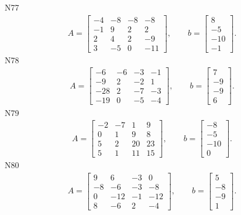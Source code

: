 \documentclass[11pt]{report}
\begin{document}
N77
\begin{align*}
 A = \left[\begin{matrix}-4 & -8 & -8 & -8\\-1 & 9 & 2 & 2\\2 & 4 & 2 & -9\\3 & -5 & 0 & -11\end{matrix}\right],
\qquad b = \left[\begin{matrix}8\\-5\\-10\\-1\end{matrix}\right]. 
 \end{align*}
N78
\begin{align*}
 A = \left[\begin{matrix}-6 & -6 & -3 & -1\\-9 & 2 & -2 & 1\\-28 & 2 & -7 & -3\\-19 & 0 & -5 & -4\end{matrix}\right],
\qquad b = \left[\begin{matrix}7\\-9\\-9\\6\end{matrix}\right]. 
 \end{align*}
N79
\begin{align*}
 A = \left[\begin{matrix}-2 & -7 & 1 & 9\\0 & 1 & 9 & 8\\5 & 2 & 20 & 23\\5 & 1 & 11 & 15\end{matrix}\right],
\qquad b = \left[\begin{matrix}-8\\-5\\-10\\0\end{matrix}\right]. 
 \end{align*}
N80
\begin{align*}
 A = \left[\begin{matrix}9 & 6 & -3 & 0\\-8 & -6 & -3 & -8\\0 & -12 & -1 & -12\\8 & -6 & 2 & -4\end{matrix}\right],
\qquad b = \left[\begin{matrix}5\\-8\\-9\\1\end{matrix}\right]. 
 \end{align*}
\end{document}

